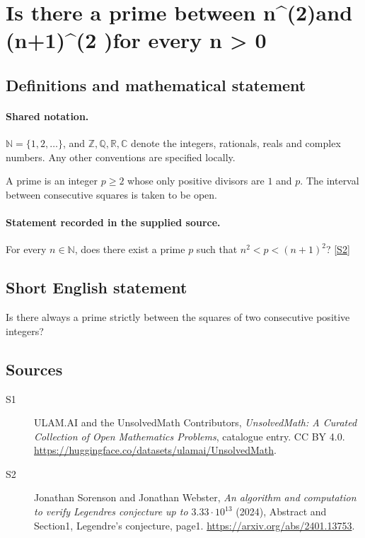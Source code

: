 \documentclass[11pt]{article}
\newcommand{\sref}[2]{\hyperlink{source:#1:#2}{[S#2]}}
\begin{document}
\section{Is there a prime between n\textasciicircum{}(2)and (n+1)\textasciicircum{}(2 )for every n > 0}\label{statement}

\subsection{Definitions and mathematical statement}

\paragraph{Shared notation.}$\mathbb N=\{1,2,\ldots\}$, and $\mathbb Z,\mathbb Q,\mathbb R,\mathbb C$ denote the integers, rationals, reals and complex numbers. Any other conventions are specified locally.


A prime is an integer $p\ge2$ whose only positive divisors are $1$ and $p$. The interval between consecutive squares is taken to be open.

\paragraph{Statement recorded in the supplied source.}
For every $n\in\mathbb N$, does there exist a prime $p$ such that $n^2<p<(n+1)^2$? \sref{statement}{2}

\subsection{Short English statement}
Is there always a prime strictly between the squares of two consecutive positive integers?
\subsection{Sources}
\begin{description}
\item[\hypertarget{source:statement:1}{S1}] ULAM.AI and the UnsolvedMath Contributors, \emph{UnsolvedMath: A Curated Collection of Open Mathematics Problems}, catalogue entry. CC BY 4.0. \url{https://huggingface.co/datasets/ulamai/UnsolvedMath}.
\item[\hypertarget{source:statement:2}{S2}] Jonathan Sorenson and Jonathan Webster, \emph{An algorithm and computation to verify Legendre\textquotesingle s conjecture up to $3.33\cdot10^{13}$} (2024), Abstract and Section1, Legendre’s conjecture, page1. \url{https://arxiv.org/abs/2401.13753}.
\end{description}
\label{end:statement}
\end{document}
